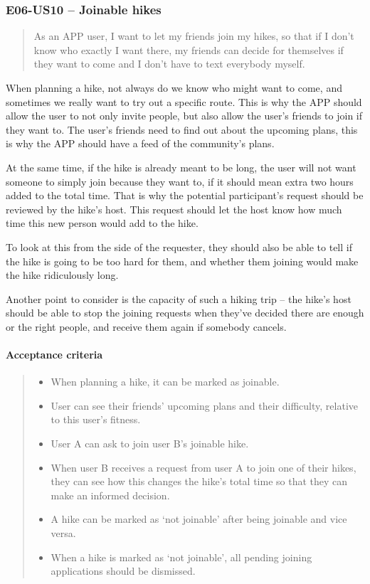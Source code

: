 
\subsubsection*{E06-US10 -- Joinable hikes}
\begin{quote}
As an APP user, I want to let my friends join my hikes, so that if I don't know who exactly I want there, my friends can decide for themselves if they want to come and I don't have to text everybody myself.
\end{quote}

When planning a hike, not always do we know who might want to come, and sometimes we really want to try out a specific route.
This is why the APP should allow the user to not only invite people, but also allow the user's friends to join if they want to.
The user's friends need to find out about the upcoming plans, this is why the APP should have a feed of the community's plans.

At the same time, if the hike is already meant to be long, the user will not want someone to simply join because they want to, if it should mean extra two hours added to the total time.
That is why the potential participant's request should be reviewed by the hike's host.
This request should let the host know how much time this new person would add to the hike.

To look at this from the side of the requester, they should also be able to tell if the hike is going to be too hard for them, and whether them joining would make the hike ridiculously long.

Another point to consider is the capacity of such a hiking trip -- the hike's host should be able to stop the joining requests when they've decided there are enough or the right people, and receive them again if somebody cancels.

\paragraph*{Acceptance criteria}
\begin{quote}
\begin{itemize}
    \item When planning a hike, it can be marked as joinable.
    \item User can see their friends' upcoming plans and their difficulty, relative to this user's fitness.
    \item User A can ask to join user B's joinable hike.
    \item When user B receives a request from user A to join one of their hikes, they can see how this changes the hike's total time so that they can make an informed decision.
    \item A hike can be marked as `not joinable' after being joinable and vice versa.
    \item When a hike is marked as `not joinable', all pending joining applications should be dismissed.
\end{itemize}
\end{quote}

